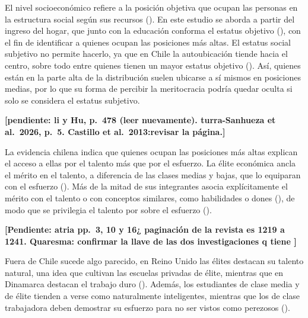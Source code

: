 \documentclass[
  spanish,
  a4paper,
  oneside]{scrbook}
\begin{document}
El nivel socioeconómico refiere a la posición objetiva que ocupan las
personas en la estructura social según sus recursos
(). En este
estudio se aborda a partir del ingreso del hogar, que junto con la
educación conforma el estatus objetivo
(), con el fin de identificar a quienes ocupan las posiciones
más altas. El estatus social subjetivo no permite hacerlo, ya que en
Chile la autoubicación tiende hacia el centro, sobre todo entre quienes
tienen un mayor estatus objetivo
().
Así, quienes están en la parte alta de la distribución suelen ubicarse a
sí mismos en posiciones medias, por lo que su forma de percibir la
meritocracia podría quedar oculta si solo se considera el estatus
subjetivo.

\textbf{{[}pendiente: li y Hu, p.~478 (leer nuevamente). turra-Sanhueza
et al.~2026, p.~5. Castillo et al.~2013:revisar la página.{]}}

La evidencia chilena indica que quienes ocupan las posiciones más altas
explican el acceso a ellas por el talento más que por el esfuerzo. La
élite económica ancla el mérito en el talento, a diferencia de las
clases medias y bajas, que lo equiparan con el esfuerzo
(). Más de la mitad de sus integrantes asocia explícitamente el
mérito con el talento o con conceptos similares, como habilidades o
dones (), de modo que se privilegia el talento por sobre el
esfuerzo ().

\textbf{{[}Pendiente: atria pp.~3, 10 y 16¿ paginación de la revista es
1219 a 1241. Quaresma: confirmar la llave de las dos investigaciones q
tiene {]}}

Fuera de Chile sucede algo parecido, en Reino Unido las élites destacan
su talento natural, una idea que cultivan las escuelas privadas de
élite, mientras que en Dinamarca destacan el trabajo duro
().
Además, los estudiantes de clase media y de élite tienden a verse como
naturalmente inteligentes, mientras que los de clase trabajadora deben
demostrar su esfuerzo para no ser vistos como perezosos
().
\end{document}
